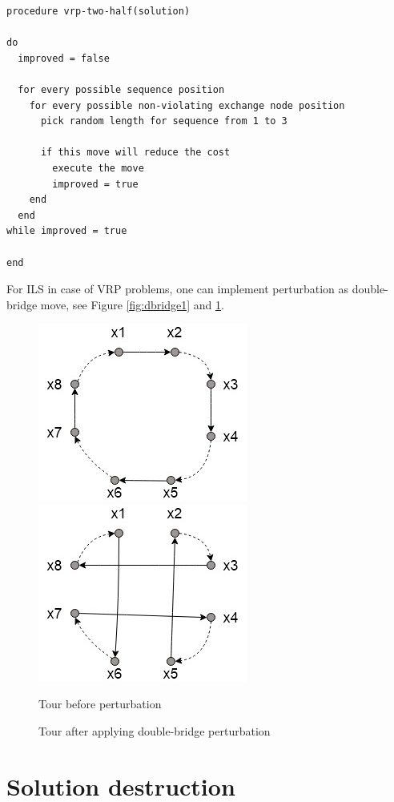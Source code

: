 \documentclass[11pt,a4paper,oneside]{book}
\begin{document}
\begin{minipage}[c, breaklines=true]{0.95\textwidth}
\begin{lstlisting}[caption={2.5-opt pseudo-code for VRP problems}, label={lst:vrp-two-half}]
procedure vrp-two-half(solution)

do
  improved = false
  
  for every possible sequence position
    for every possible non-violating exchange node position
      pick random length for sequence from 1 to 3
    
      if this move will reduce the cost
        execute the move
        improved = true
    end
  end
while improved = true

end
\end{lstlisting}
\end{minipage}

For ILS in case of VRP problems, one can implement perturbation as double-bridge move, see Figure \ref{fig:dbridge1} and \ref{fig:dbridge2}.


\begin{multicols}{2}
\begin{figure}[ht!]
\includegraphics[width=.3\textwidth]{double-bridge/1.jpg}\hfill
\includegraphics[width=.3\textwidth]{double-bridge/2.jpg}
\caption{Tour before perturbation} \label{fig:dbridge1}
\caption{Tour after applying double-bridge perturbation} \label{fig:dbridge2}
\end{figure}
\end{multicols}


\section{Solution destruction}
\end{document}
